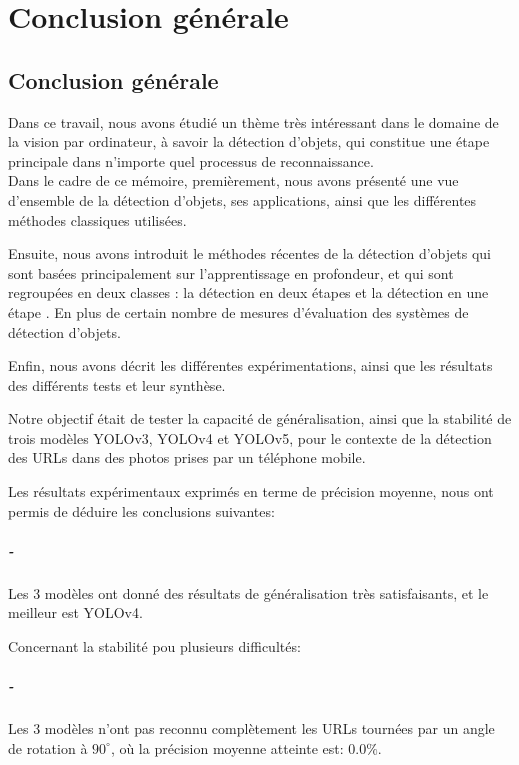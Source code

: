 \chapter*{Conclusion générale}
\pagestyle{fancy}
\fancyhead[L]{}
\renewcommand{\headrulewidth}{1pt}
\fancyfoot[C]{\thepage}
\section*{Conclusion générale}
Dans ce travail, nous avons étudié un thème très intéressant dans le domaine de la vision par ordinateur, à savoir  la détection d'objets, qui constitue une étape principale dans n'importe quel processus  de reconnaissance.\\

Dans le cadre de ce mémoire, premièrement, nous avons présenté une vue d'ensemble de la détection  d'objets, ses  applications, ainsi que les différentes méthodes classiques utilisées.

Ensuite, nous avons introduit  le méthodes récentes de la détection d'objets qui sont basées principalement sur l'apprentissage en profondeur, et qui sont regroupées en  deux classes : la détection en deux étapes  et la détection en une étape . En plus de certain nombre de mesures d'évaluation des systèmes de détection d'objets. 


Enfin, nous avons décrit les différentes expérimentations, ainsi que les résultats des différents tests et leur synthèse. 


Notre objectif était de tester la capacité de généralisation, ainsi que la stabilité de trois   modèles YOLOv3, YOLOv4 et YOLOv5, pour le contexte de la détection des URLs dans des photos prises par un téléphone mobile.

Les résultats expérimentaux exprimés en terme de précision moyenne, nous ont permis  de déduire les conclusions suivantes:
\paragraph{-} Les 3 modèles ont donné des résultats de généralisation très satisfaisants, et le meilleur est YOLOv4. 

Concernant la stabilité pou plusieurs difficultés: 

\paragraph{-} Les 3 modèles n'ont pas reconnu complètement les URLs  tournées par un angle de rotation à $90^\circ$, où la précision moyenne atteinte est: $0.0\%$.

